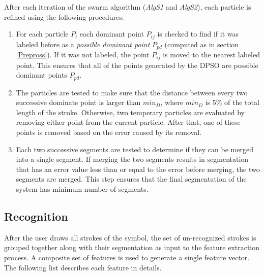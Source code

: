 \documentclass[preprint,10pt,5p,twocolumn]{elsarticle}
\begin{document}
After each iteration of the swarm algorithm (\textsl{AlgS1} and \textsl{AlgS2}), each particle is refined using the following procedures: 
\begin{enumerate}
	\item For each particle $P_i$ each dominant point $P_{ij}$ is checked to find if it was labeled before as a \textit{possible dominant point} $P_{pd}$ (computed as in section \ref{Prepross}). If it was not labeled, the point $P_{ij}$ is moved to the nearest labeled point. This ensures that all of the points generated by the DPSO are possible dominant points $P_{pd}$. 
	\item The particles are tested to make sure that the distance between every two successive dominate point is larger than $min_D$, where $min_D$ is 5\% of the total length of the stroke.  Otherwise, two temperary particles are evaluated by removing either point from the current particle. After that, one of these points is removed based on the error caused by its removal.
	\item Each two successive segments are tested to determine if they can be merged into a single segment. If merging the two segments results in segmentation that has an error value less than or equal to the error before merging, the two segments are merged. This step ensures that the final segmentation of the system has minimum number of segments. 
\end{enumerate}
\subsection{Recognition}
\label{sec:Recognition}
After the user draws all strokes of the symbol, the set of un-recognized strokes is grouped together along with their segmentation as input to the feature extraction process. A composite set of features is used to generate a single feature vector. The following list describes each feature in details.
\end{document}
